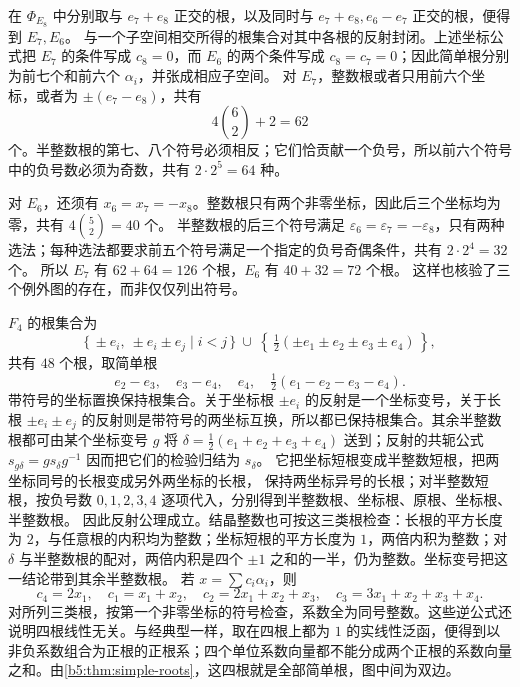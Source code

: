 \ProseParagraphBreak

在 \(\Phi_{E_8}\) 中分别取与 \(e_7+e_8\) 正交的根，以及同时与 \(e_7+e_8,e_6-e_7\) 正交的根，便得到 \(E_7,E_6\)。 与一个子空间相交所得的根集合对其中各根的反射封闭。上述坐标公式把 \(E_7\) 的条件写成 \(c_8=0\)，而 \(E_6\) 的两个条件写成 \(c_8=c_7=0\)；因此简单根分别为前七个和前六个 \(\alpha_i\)，并张成相应子空间。 对 \(E_7\)，整数根或者只用前六个坐标，或者为 \(\pm(e_7-e_8)\)，共有
\[
	4\binom62+2=62
\]
个。半整数根的第七、八个符号必须相反；它们恰贡献一个负号，所以前六个符号中的负号数必须为奇数，共有 \(2\cdot2^5=64\) 种。

\ProseParagraphBreak

对 \(E_6\)，还须有 \(x_6=x_7=-x_8\)。整数根只有两个非零坐标，因此后三个坐标均为零，共有 \(4\binom52=40\) 个。 半整数根的后三个符号满足 \(\varepsilon_6=\varepsilon_7=-\varepsilon_8\)，只有两种选法；每种选法都要求前五个符号满足一个指定的负号奇偶条件，共有 \(2\cdot2^4=32\) 个。 所以 \(E_7\) 有 \(62+64=126\) 个根，\(E_6\) 有 \(40+32=72\) 个根。 这样也核验了三个例外图的存在，而非仅仅列出符号。

\ProseParagraphBreak

\(F_4\) 的根集合为
\[
	\{\,\pm e_i,\ \pm e_i\pm e_j\mid i<j\,\} \ \cup\
	\left\{\,\tfrac12(\pm e_1\pm e_2\pm e_3\pm e_4)\,\right\},
\]
共有 \(48\) 个根，取简单根
\[
	e_2-e_3,\quad e_3-e_4,\quad e_4,\quad \tfrac12(e_1-e_2-e_3-e_4).
\]
带符号的坐标置换保持根集合。关于坐标根 \(\pm e_i\) 的反射是一个坐标变号，关于长根 \(\pm e_i\pm e_j\) 的反射则是带符号的两坐标互换，所以都已保持根集合。其余半整数根都可由某个坐标变号 \(g\) 将 \(\delta=\tfrac12(e_1+e_2+e_3+e_4)\) 送到；反射的共轭公式 \(s_{g\delta}=gs_\delta g^{-1}\) 因而把它们的检验归结为 \(s_\delta\)。 它把坐标短根变成半整数短根，把两坐标同号的长根变成另外两坐标的长根， 保持两坐标异号的长根；对半整数短根，按负号数 \(0,1,2,3,4\) 逐项代入，分别得到半整数根、坐标根、原根、坐标根、半整数根。 因此反射公理成立。结晶整数也可按这三类根检查：长根的平方长度为 \(2\)，与任意根的内积均为整数；坐标短根的平方长度为 \(1\)，两倍内积为整数；对 \(\delta\) 与半整数根的配对，两倍内积是四个 \(\pm1\) 之和的一半，仍为整数。坐标变号把这一结论带到其余半整数根。 若 \(x=\sum c_i\alpha_i\)，则
\[
	c_4=2x_1,\quad c_1=x_1+x_2,\quad c_2=2x_1+x_2+x_3,\quad c_3=3x_1+x_2+x_3+x_4.
\]
对所列三类根，按第一个非零坐标的符号检查，系数全为同号整数。这些逆公式还说明四根线性无关。与经典型一样，取在四根上都为 \(1\) 的实线性泛函，便得到以非负系数组合为正根的正根系；四个单位系数向量都不能分成两个正根的系数向量之和。由\cref{b5:thm:simple-roots}，这四根就是全部简单根，图中间为双边。


